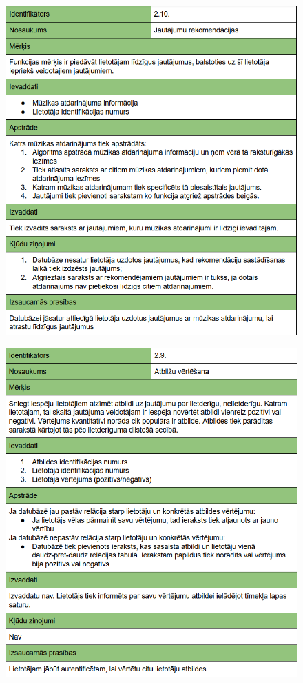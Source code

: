 \documentclass[12pt]{article}
\begin{document}
\begin{figure}[H]
\begin{center}
	\includegraphics[scale=0.8]{Capture2.png}
	\label{fig:rekomendacijasPPS}
\end{center}
\end{figure}

\begin{figure}[H]
\begin{center}
	\includegraphics[scale=0.8]{Capture1.png}
	\label{fig:vertesanaPPS}
\end{center}
\end{figure}
\end{document}
